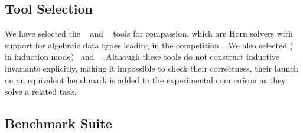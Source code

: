 \subsection{Tool Selection}
We have selected the \racer{}~\cite{10.1145/3498722} and \eldarica{}~\cite{8603013} tools for compassion, which are Horn solvers with support for algebraic data types leading in the \chccomp{} competition~\cite{De_Angelis_2022}. We also selected \cvcind{} (\cvc{} in induction mode)~\cite{reynolds2015induction} and \vericat{}~\cite{10.1093/logcom/exab090}. Although these tools do not construct inductive invariants explicitly, making it impossible to check their correctness, their launch on an equivalent benchmark is added to the experimental comparison as they solve a related task.



\subsection{Benchmark Suite}

